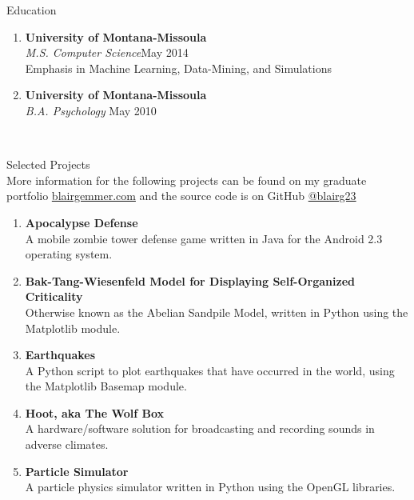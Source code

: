\documentclass[oneside]{article}%
\begin{document}
\newpage
\noindent
\huge{Education}
\normalsize
\begin{enumerate}[]
\item \textbf{University of Montana-Missoula}\\
\vspace{2mm}
	\textit{M.S. Computer Science}\hfill May 2014\\
	Emphasis in Machine Learning, Data-Mining, and Simulations
	\
\item \textbf{University of Montana-Missoula}\\
	\textit{B.A. Psychology} \hfill May 2010
\end{enumerate}
\

\noindent
\huge{Selected Projects}\\
\normalsize
More information for the following projects can be found on my graduate portfolio \href{blairgemmer.com}{blairgemmer.com} and the source code is on GitHub \href{https://github.com/blairg23}{@blairg23}
\begin{enumerate}[]
	\item \textbf{Apocalypse Defense}\\
		A mobile zombie tower defense game written in Java for the Android 2.3 operating system.
	\item \textbf{Bak-Tang-Wiesenfeld Model for Displaying Self-Organized\\ Criticality}\\
		Otherwise known as the Abelian Sandpile Model, written in Python using the Matplotlib module.
	\item \textbf{Earthquakes}\\
		A Python script to plot earthquakes that have occurred in the world, using the Matplotlib Basemap module.
	\item \textbf{Hoot, aka The Wolf Box}\\
		A hardware/software solution for broadcasting and recording sounds in adverse climates.
	\item \textbf{Particle Simulator}\\
		A particle physics simulator written in Python using the OpenGL libraries.
\end{enumerate}
\end{document}
